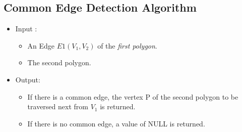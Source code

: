 	\subsection{Common Edge Detection Algorithm}
	\label{commalgo}
	\begin{itemize}
	\item
	Input : 
			\begin{itemize}
			\item
			An Edge $E1 (V_{1},V_{2})$ of the {\em first polygon}. 
			\item
			The second polygon.
			\end{itemize}

	\item
	Output: 
			\begin{itemize}
			\item
			If there is a common edge, the vertex P of the second polygon to 
			be traversed next from $V_{1}$ is returned.
			\item
			If there is no common edge, a value of NULL is returned.
			\end{itemize}
	\end{itemize}

